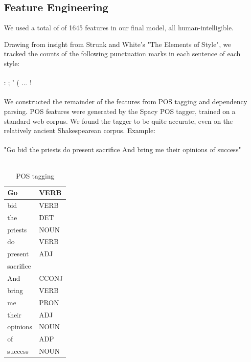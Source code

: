 \documentclass[letterpaper, 10 pt, conference]{ieeeconf}  %
\begin{document}
\subsection{Feature Engineering}
We used a total of of 1645 features in our final model, all human-intelligible.

Drawing from insight from Strunk and White's "The Elements of Style", we tracked the counts of the following punctuation marks in each sentence of each style: 
\\
\\
 : ; ' ( ... !
\\
\\
We constructed the remainder of the features from POS tagging and dependency parsing.
POS features were generated by the Spacy POS tagger, trained on a standard web corpus. We found the tagger to be quite accurate, even on the relatively ancient Shakespearean corpus. Example:\\
\\
"Go bid the priests do present sacrifice And bring me their opinions of success"\\
\\

\begin{table}[h]
  \caption{POS tagging}
  \label{table_example}
  \begin{center}
    \begin{tabular}{| p{2cm}  | p{2cm} | }
      \hline
      Go&VERB  \\  
      \hline
      bid&VERB\\ 
      \hline
      the&DET   \\
      \hline
      priests&NOUN \\
      \hline
      do&VERB   \\
      \hline
      present&ADJ  \\
      \hline
      sacrifice&\\
      \hline
      And&CCONJ \\
      \hline
      bring&VERB  \\
      \hline
      me&PRON   \\
      \hline
      their&ADJ    \\
      \hline
      opinions&NOUN  \\
      \hline
      of&ADP    \\
      \hline
      success&NOUN \\
      \hline
    \end{tabular}
  \end{center}
\end{table}
\end{document}
